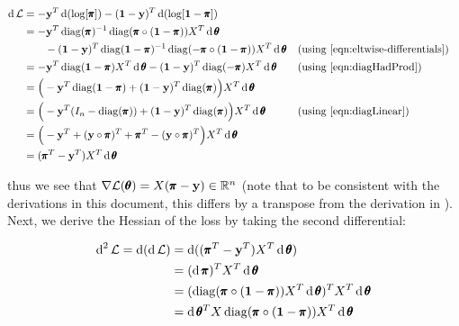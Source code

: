 \begin{align}
  \operatorname{\text{d}} \mathcal{L} &= -\mathbf{y}^T \operatorname{\text{d}}(\log[\pmb{\pi}]) - (\mathbf{1} - \mathbf{y})^T \operatorname{\text{d}}(\log[\mathbf{1} - \pmb{\pi}]) \\
                  &= -\mathbf{y}^T \operatorname{diag}(\pmb{\pi})^{-1}\operatorname{diag}(\pmb{\pi} \circ ( \mathbf{1} - \pmb{\pi}))X^T \operatorname{\text{d}} \pmb{\theta} \nonumber \\
                  & \quad \quad - (\mathbf{1} - \mathbf{y})^T \operatorname{diag}(\mathbf{1} - \pmb{\pi})^{-1}\operatorname{diag}(-\pmb{\pi} \circ ( \mathbf{1} - \pmb{\pi})) X^T \operatorname{\text{d}} \pmb{\theta} && \text{(using \ref{eqn:eltwise-differentials})} \\
                  &= -\mathbf{y}^T \operatorname{diag}(\mathbf{1} - \pmb{\pi})X^T \operatorname{\text{d}} \pmb{\theta} - (\mathbf{1} - \mathbf{y})^T \operatorname{diag}(-\pmb{\pi}) X^T \operatorname{\text{d}} \pmb{\theta} && \text{(using \ref{eqn:diagHadProd})}\\                  
                  &= \Big(-\mathbf{y}^T \operatorname{diag}(\mathbf{1} - \pmb{\pi}) + (\mathbf{1} - \mathbf{y})^T \operatorname{diag}(\pmb{\pi})\Big) X^T \operatorname{\text{d}} \pmb{\theta}\\                                    
                  &= \Big(-\mathbf{y}^T (I_n - \operatorname{diag}(\pmb{\pi})) + (\mathbf{1} - \mathbf{y})^T \operatorname{diag}(\pmb{\pi})\Big) X^T \operatorname{\text{d}} \pmb{\theta} && \text{(using \ref{eqn:diagLinear})}\\                                                      
                  &= \Big(-\mathbf{y}^T + (\mathbf{y} \circ \pmb{\pi})^T + \pmb{\pi}^T - (\mathbf{y} \circ \pmb{\pi})^T \Big) X^T \operatorname{\text{d}} \pmb{\theta}\\                                                                                          
                  &= ( \pmb{\pi}^T -\mathbf{y}^T) X^T \operatorname{\text{d}} \pmb{\theta}\\                                                                                                            
\end{align}

thus we see that $\nabla \mathcal{L}(\pmb{\theta}) = X ( \pmb{\pi} - \mathbf{y}) \in \mathbb{R}^n$ (note that to be consistent with the derivations in this document, this differs by a transpose from the derivation in \cite{defreitas}).  Next, we derive the Hessian of the loss by taking the second differential:

\begin{align}
  \operatorname{\text{d}}^2 \mathcal{L} = \operatorname{\text{d}} (\operatorname{\text{d}} \mathcal{L}) &= \operatorname{\text{d}}(( \pmb{\pi}^T -\mathbf{y}^T) X^T \operatorname{\text{d}} \pmb{\theta})\\   
  &= (\operatorname{\text{d}} \pmb{\pi})^T X^T \operatorname{\text{d}} \pmb{\theta}\\                                                                                                            
  &= (\operatorname{diag}(\pmb{\pi}\circ (\mathbf{1} - \pmb{\pi}))X^T \operatorname{\text{d}} \pmb{\theta})^T X^T \operatorname{\text{d}} \pmb{\theta}\\                                                                               
  &= \operatorname{\text{d}} \pmb{\theta}^T X \operatorname{diag}(\pmb{\pi}\circ (\mathbf{1} - \pmb{\pi})) X^T \operatorname{\text{d}} \pmb{\theta}\\                                                                                                                                         
\end{align}

